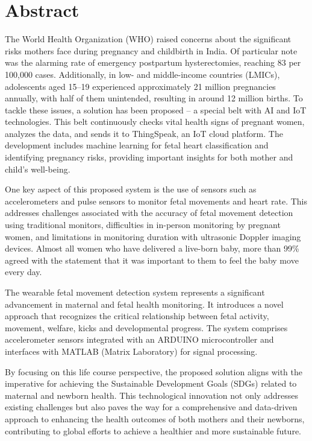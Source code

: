 \documentclass[12pt,a4paper,oneside]{report}
\begin{document}
	\newpage
	\tableofcontents
	
	
	\newpage
	\section*{Abstract}
		The World Health Organization (WHO) raised concerns about the significant risks mothers face during pregnancy and childbirth in India. Of particular note was the alarming rate of emergency postpartum hysterectomies, reaching 83 per 100,000 cases. Additionally, in low- and middle-income countries (LMICs), adolescents aged 15–19 experienced approximately 21 million pregnancies annually, with half of them unintended, resulting in around 12 million births.		
		To tackle these issues, a solution has been proposed – a special belt with AI and IoT technologies. This belt continuously checks vital health signs of pregnant women, analyzes the data, and sends it to ThingSpeak, an IoT cloud platform. The development includes machine learning for fetal heart classification and identifying pregnancy risks, providing important insights for both mother and child's well-being.
		
		One key aspect of this proposed system is the use of sensors such as accelerometers and pulse sensors to monitor fetal movements and heart rate. This addresses challenges associated with the accuracy of fetal movement detection using traditional monitors, difficulties in in-person monitoring by pregnant women, and limitations in monitoring duration with ultrasonic Doppler imaging devices. Almost all women who have delivered a live-born baby, more than 99\% agreed with the statement that it was important to them to feel the baby move every day.
		
		The wearable fetal movement detection system represents a significant advancement in maternal and fetal health monitoring. It introduces a novel approach that recognizes the critical relationship between fetal activity, movement, welfare, kicks and developmental progress. The system comprises accelerometer sensors integrated with an ARDUINO microcontroller and interfaces with MATLAB (Matrix Laboratory) for signal processing.
		
		By focusing on this life course perspective, the proposed solution aligns with the imperative for achieving the Sustainable Development Goals (SDGs) related to maternal and newborn health. This technological innovation not only addresses existing challenges but also paves the way for a comprehensive and data-driven approach to enhancing the health outcomes of both mothers and their newborns, contributing to global efforts to achieve a healthier and more sustainable future.
		
\end{document}
